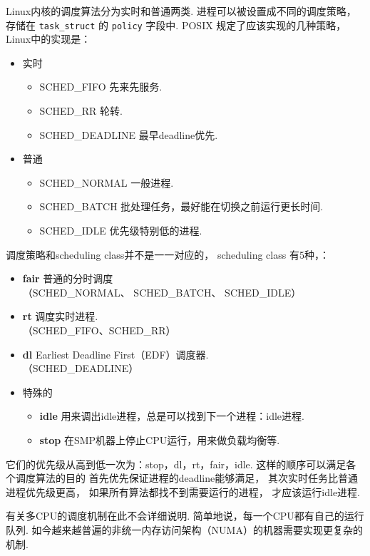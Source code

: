 Linux内核的调度算法分为实时和普通两类.
进程可以被设置成不同的调度策略，
存储在 \lstinline{task_struct} 的 \lstinline{policy} 字段中.
POSIX 规定了应该实现的几种策略\cite{schedh}，
Linux中的实现是：
\begin{itemize}
	\item 实时
	      \begin{itemize}
		      \item SCHED\_FIFO 先来先服务.
		      \item SCHED\_RR 轮转.
		      \item SCHED\_DEADLINE 最早deadline优先.
	      \end{itemize}
	\item 普通
	      \begin{itemize}
		      \item SCHED\_NORMAL 一般进程.
		      \item SCHED\_BATCH 批处理任务，最好能在切换之前运行更长时间.
		      \item SCHED\_IDLE 优先级特别低的进程.
	      \end{itemize}
\end{itemize}

调度策略和scheduling class并不是一一对应的，
scheduling class 有5种，：
\begin{itemize}
	\item \textbf{fair} 普通的分时调度 \\
	      （SCHED\_NORMAL、 SCHED\_BATCH、 SCHED\_IDLE）
	\item \textbf{rt} 调度实时进程. \\
	      （SCHED\_FIFO、SCHED\_RR）
	\item \textbf{dl} Earliest Deadline First（EDF）调度器. \\
	      （SCHED\_DEADLINE）
	\item 特殊的
	      \begin{itemize}
		      \item \textbf{idle} 用来调出idle进程，总是可以找到下一个进程：idle进程.
		      \item \textbf{stop} 在SMP机器上停止CPU运行，用来做负载均衡等.
	      \end{itemize}
\end{itemize}

它们的优先级从高到低一次为：stop，dl，rt，fair，idle.
这样的顺序可以满足各个调度算法的目的
首先优先保证进程的deadline能够满足，
其次实时任务比普通进程优先级更高，
如果所有算法都找不到需要运行的进程，
才应该运行idle进程.

\begin{notebox}
	有关多CPU的调度机制在此不会详细说明.
	简单地说，每一个CPU都有自己的运行队列.
	如今越来越普遍的非统一内存访问架构（NUMA）的机器需要实现更复杂的机制.
\end{notebox}

